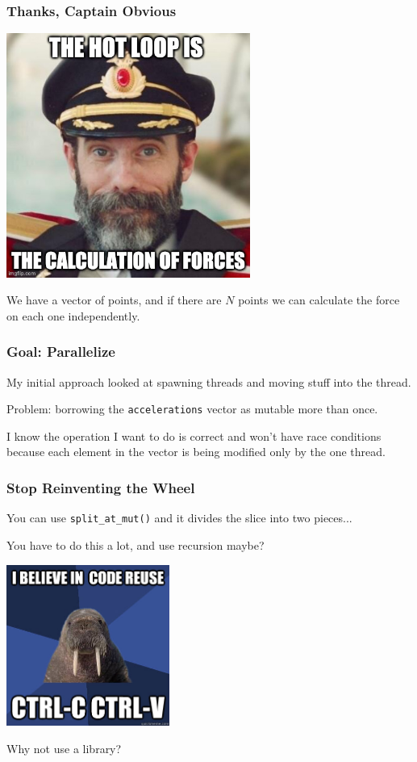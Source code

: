 \begin{frame}
\frametitle{Thanks, Captain Obvious}

\begin{center}
	\includegraphics[width=0.6\textwidth]{images/captainobvious.jpg}
\end{center}

We have a vector of points, and if there are $N$ points we can calculate the force on each one independently. 


\end{frame}



\begin{frame}
\frametitle{Goal: Parallelize}

My initial approach looked at spawning threads and moving stuff into the thread.

Problem: borrowing the \texttt{accelerations} vector as mutable more than once.

I know the operation I want to do is correct and won't have race conditions because each element in the vector is being modified only by the one thread.

\end{frame}


\begin{frame}
\frametitle{Stop Reinventing the Wheel}

You can use \texttt{split\_at\_mut()} and it divides the slice into two pieces...

You have to do this a lot, and use recursion maybe?

\begin{center}
	\includegraphics[width=0.4\textwidth]{images/code-reuse.jpg}
\end{center}

Why not use a library?
\end{frame}


